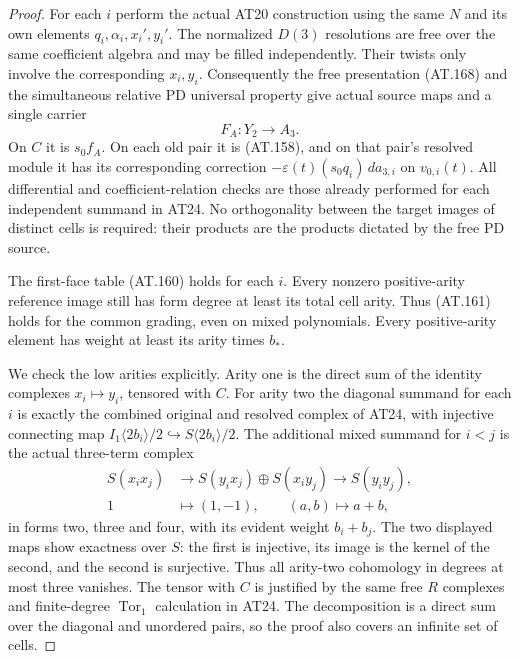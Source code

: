 \begin{proof}
For each $i$ perform the actual AT20 construction
using the same $N$ and its own elements
$q_i,\alpha_i,x_i',y_i'$.
The normalized $D(3)$ resolutions are free over
the same coefficient algebra and may be filled
independently. Their twists only involve the
corresponding $x_i,y_i$.
Consequently the free presentation (AT.168) and
the simultaneous relative PD universal property
give actual source maps and a single carrier
\[
                            F_A:Y_2\longrightarrow A_3.
 \tag{AT.169}
\]
On $C$ it is $s_0f_A$.
On each old pair it is (AT.158), and on that pair's
resolved module it has its corresponding correction
$-\varepsilon(t)(s_0q_i)\,da_{3,i}$ on $v_{0,i}(t)$.
All differential and coefficient-relation checks
are those already performed for each independent
summand in AT24. No orthogonality between the
target images of distinct cells is required:
their products are the products dictated by the
free PD source.

The first-face table (AT.160) holds for each $i$.
Every nonzero positive-arity reference image
still has form degree at least its total cell
arity. Thus (AT.161) holds for the common
grading, even on mixed polynomials.
Every positive-arity element has weight at least
its arity times $b_*$.

We check the low arities explicitly.
Arity one is the direct sum of the identity
complexes $x_i\mapsto y_i$, tensored with $C$.
For arity two the diagonal summand for each $i$
is exactly the combined original and resolved
complex of AT24, with injective connecting map
$I_1\langle2b_i\rangle/2\hookrightarrow
S\langle2b_i\rangle/2$.
The additional mixed summand for $i<j$ is
the actual three-term complex
\[
 \begin{split}
 S(x_i x_j)&\longrightarrow
 S(y_i x_j)\oplus S(x_i y_j)
                \longrightarrow S(y_i y_j),\\
 1&\longmapsto(1,-1),\qquad
 (a,b)\longmapsto a+b ,
 \end{split}
 \tag{AT.170}
\]
in forms two, three and four, with its evident
weight $b_i+b_j$.
The two displayed maps show exactness over $S$:
the first is injective, its image is the kernel
of the second, and the second is surjective.
Thus all arity-two cohomology in degrees at most
three vanishes. The tensor with $C$ is justified
by the same free $R$ complexes and finite-degree
$\operatorname{Tor}_1$ calculation in AT24.
The decomposition is a direct sum over the
diagonal and unordered pairs, so the proof
also covers an infinite set of cells.


\end{proof}
